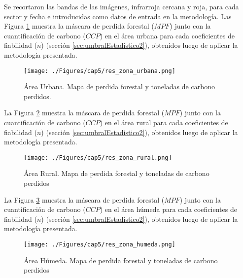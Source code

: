 Se recortaron las bandas de las im\'agenes, infrarroja cercana y roja, para cada sector y fecha e introducidas como datos de entrada en la metodolog\'ia. Las Figura \ref{fig:ubana} muestra la m\'ascara de perdida forestal ($ MPF $) junto con la cuantificaci\'on de carbono ($ CCP $) en el \'area urbana para cada coeficientes de fiabilidad ($ n $) (secci\'on \ref{sec:umbralEstadistico2}), obtenidos luego de aplicar la metodolog\'ia presentada.
\begin{figure}[H]
	\centering
	\texttt{[image: ./Figures/cap5/res\_zona\_urbana.png]}
	\caption{\'Area Urbana. Mapa de perdida forestal y toneladas de carbono perdidos.}
	\label{fig:ubana}
\end{figure}
La Figura \ref{fig:rural} muestra la m\'ascara de perdida forestal ($ MPF $) junto con la cuantificaci\'on de carbono ($ CCP $) en el \'area rural para cada coeficientes de fiabilidad ($ n $) (secci\'on \ref{sec:umbralEstadistico2}), obtenidos luego de aplicar la metodolog\'ia presentada. 
\begin{figure}[H]
	\centering
	\texttt{[image: ./Figures/cap5/res\_zona\_rural.png]}
	\caption{\'Area Rural. Mapa de perdida forestal y toneladas de carbono perdidos}
	\label{fig:rural}
\end{figure}
La Figura \ref{fig:humeda} muestra la m\'ascara de perdida forestal ($ MPF $) junto con la cuantificaci\'on de carbono ($ CCP $) en el \'area h\'umeda para cada coeficientes de fiabilidad ($ n $) (secci\'on \ref{sec:umbralEstadistico2}), obtenidos luego de aplicar la metodolog\'ia presentada.
\begin{figure}[H]
	\centering
	\texttt{[image: ./Figures/cap5/res\_zona\_humeda.png]}
	\caption{\'Area H\'umeda. Mapa de perdida forestal y toneladas de carbono perdidos}
	\label{fig:humeda}
\end{figure}


